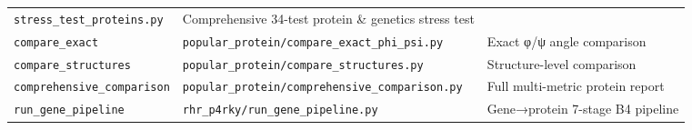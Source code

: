\documentclass[12pt,a4paper]{article}
\begin{document}
\begin{longtable}[]{@{}lll@{}}
\begin{minipage}[t]{0.24\columnwidth}
\texttt{stress\_test\_proteins.py}\strut
\end{minipage} & \begin{minipage}[t]{0.43\columnwidth}\raggedright
Comprehensive 34-test protein \& genetics stress test\strut
\end{minipage}\tabularnewline
\begin{minipage}[t]{0.24\columnwidth}\raggedright
\texttt{compare\_exact}\strut
\end{minipage} & \begin{minipage}[t]{0.24\columnwidth}\raggedright
\texttt{popular\_protein/compare\_exact\_phi\_psi.py}\strut
\end{minipage} & \begin{minipage}[t]{0.43\columnwidth}\raggedright
Exact φ/ψ angle comparison\strut
\end{minipage}\tabularnewline
\begin{minipage}[t]{0.24\columnwidth}\raggedright
\texttt{compare\_structures}\strut
\end{minipage} & \begin{minipage}[t]{0.24\columnwidth}\raggedright
\texttt{popular\_protein/compare\_structures.py}\strut
\end{minipage} & \begin{minipage}[t]{0.43\columnwidth}\raggedright
Structure-level comparison\strut
\end{minipage}\tabularnewline
\begin{minipage}[t]{0.24\columnwidth}\raggedright
\texttt{comprehensive\_comparison}\strut
\end{minipage} & \begin{minipage}[t]{0.24\columnwidth}\raggedright
\texttt{popular\_protein/comprehensive\_comparison.py}\strut
\end{minipage} & \begin{minipage}[t]{0.43\columnwidth}\raggedright
Full multi-metric protein report\strut
\end{minipage}\tabularnewline
\begin{minipage}[t]{0.24\columnwidth}\raggedright
\texttt{run\_gene\_pipeline}\strut
\end{minipage} & \begin{minipage}[t]{0.24\columnwidth}\raggedright
\texttt{rhr\_p4rky/run\_gene\_pipeline.py}\strut
\end{minipage} & \begin{minipage}[t]{0.43\columnwidth}\raggedright
Gene→protein 7-stage B4 pipeline\strut
\end{minipage}\tabularnewline

\end{longtable}
\end{document}
